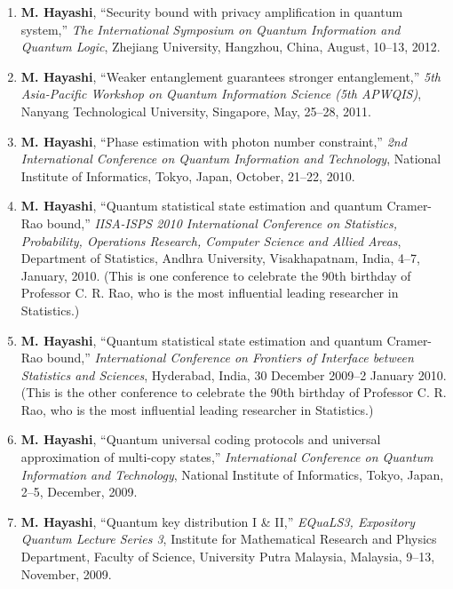 \documentclass[a4paper,12pt,oneside]{article}
\begin{document}
\begin{enumerate}
\item 
\textbf{M. Hayashi}, 
``Security bound with privacy amplification in quantum system,'' 
{\em The International Symposium on Quantum Information and Quantum Logic}, 
Zhejiang University, Hangzhou, China, August, 10--13, 2012.


\item 
\textbf{M. Hayashi}, 
``Weaker entanglement guarantees stronger entanglement,'' 
{\em 5th Asia-Pacific Workshop on Quantum Information Science (5th APWQIS)}, 
Nanyang Technological University, Singapore, May, 25--28, 2011.

\item 
\textbf{M. Hayashi}, 
``Phase estimation with photon number constraint,'' 
{\em 2nd International Conference on Quantum Information and Technology}, 
National Institute of Informatics, Tokyo, Japan, October, 21--22, 2010.

\item 
\textbf{M. Hayashi}, 
``Quantum statistical state estimation and quantum Cramer-Rao bound,'' 
{\em IISA-ISPS 2010 International Conference on Statistics, Probability, Operations Research, Computer Science and Allied Areas}, 
Department of Statistics, Andhra University, Visakhapatnam, India, 4--7, January, 2010.
(This is one conference to celebrate the 90th birthday of Professor C. R. Rao,
who is the most influential leading researcher in Statistics.)

\item 
\textbf{M. Hayashi}, 
``Quantum statistical state estimation and quantum Cramer-Rao bound,'' 
{\em International Conference on Frontiers of Interface between Statistics and Sciences}, 
Hyderabad, India, 30 December 2009--2 January 2010.
(This is the other conference to celebrate the 90th birthday of Professor C. R. Rao,
who is the most influential leading researcher in Statistics.)


\item 
\textbf{M. Hayashi}, 
``Quantum universal coding protocols and universal approximation of multi-copy states,'' 
{\em International Conference on Quantum Information and Technology}, 
National Institute of Informatics, Tokyo, Japan, 2--5, December, 2009.

\item 
\textbf{M. Hayashi}, 
``Quantum key distribution I \& II,'' 
{\em EQuaLS3, Expository Quantum Lecture Series 3}, 
Institute for Mathematical Research and Physics Department, Faculty of Science, University Putra Malaysia, Malaysia, 9--13, November, 2009.


\end{enumerate}
\end{document}
